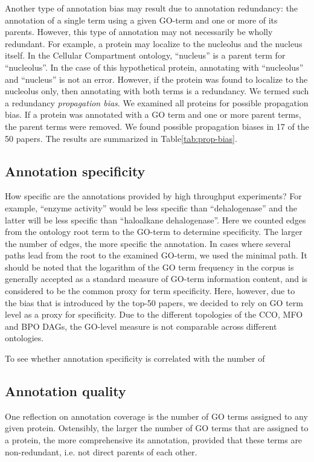 \documentclass[10pt]{bmc_article}
\newenvironment{bmcformat}{\begin{raggedright}\baselineskip20pt\sloppy\setboolean{publ}{false}}{\end{raggedright}\baselineskip20pt\sloppy}
\begin{document}
\begin{bmcformat}
Another type of annotation bias may result due to annotation redundancy: the annotation of
a single term using a given GO-term and one or more of its parents. However, this type of
annotation may not necessarily be wholly redundant. For example, a protein may localize to
the nucleolus and the nucleus itself. In the Cellular Compartment ontology, ``nucleus'' is
a parent term for ``nucleolus''. In the case of this hypothetical protein, annotating with
``nucleolus'' and ``nucleus'' is not an error. However, if the protein was found to
localize to the nucleolus only, then annotating with both terms is a redundancy. We termed
such a redundancy \textit{propagation bias}. We examined all proteins for possible propagation
bias. If a protein was annotated with a GO term and one or more parent terms, the parent
terms were removed. We found possible propagation biases in 17 of the 50 papers. The results
are summarized in Table\ref{tab:prop-bias}. 

\subsection*{Annotation specificity}

How specific are the annotations provided by high throughput experiments? For example,
``enzyme activity'' would be less specific than ``dehalogenase'' and the latter will be
less specific than ``haloalkane dehalogenase''. Here we counted edges from the ontology
root term to the GO-term to determine specificity. The larger the number of edges, the
more specific the annotation. In cases where several paths lead from the root to the
examined GO-term, we used the minimal path. It should be noted that the logarithm of
the GO term frequency in the corpus is generally accepted as a standard measure of GO-term
information content, and is considered to be the common proxy for term
specificity\cite{lord-semsim}. Here,
however, due to the bias that is introduced by the top-50 papers, we decided to rely on GO
term level as a proxy for specificity. Due to the different topologies of the CCO, MFO and
BPO DAGs, the GO-level measure is not comparable across different ontologies.

To see whether annotation specificity is correlated with the number of 


\subsection*{Annotation quality}

One reflection on annotation coverage is the number of GO terms assigned to any
given protein. Ostensibly, the larger the number of GO terms that are assigned to a
protein, the more comprehensive its annotation, provided that these terms are
non-redundant, i.e. not direct parents of each other. 


\end{bmcformat}
\end{document}
